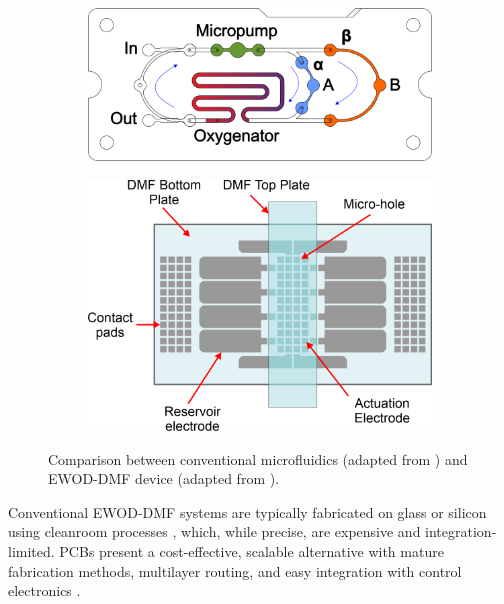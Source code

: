 \documentclass[conference,a4paper]{IEEEtran}
\begin{document}
\begin{figure}[h!]
\centering
\begin{subfigure}[b]{0.49\linewidth}
\centering
\includegraphics[width=\linewidth]{ExampleMicrofluidics.png}
\caption{}
\label{microfluidics_example}
\end{subfigure}
\begin{subfigure}[b]{0.49\linewidth}
\centering
\includegraphics[width=\linewidth]{ExampleDMF.png}
\caption{}
\label{dmf_example}
\end{subfigure}
\caption{Comparison between  conventional microfluidics (adapted from \cite{busekDesignCharacterizationModeling2016}) and  EWOD-DMF device (adapted from \cite{pengAllinOneDigitalMicrofluidics2023}).}
\label{microfluidics_vs_dmf}
\end{figure}

Conventional EWOD-DMF systems are typically fabricated on glass or silicon using cleanroom processes \cite{vafaieNumericalSimulationEWOD2019}, which, while precise, are expensive and integration-limited. PCBs present a cost-effective, scalable alternative with mature fabrication methods, multilayer routing, and easy integration with control electronics \cite{jiangongDirectreferencingTwodimensionalarrayDigital2008,sukthangRapidFabricationCloseTyped2020,yiDesignOpenElectrowetting2020}.
\end{document}
